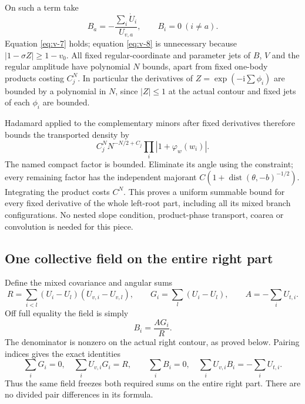 \documentclass[11pt]{article}
\numberwithin{equation}{section}
\theoremstyle{remark}\newtheorem{remark}[theorem]{Remark}
\newcommand{\ii}{\mathrm i}
\begin{document}
On such a term take
\begin{equation}\label{eq:v-10}
B_a=-\frac{\sum_i\dot U_i}{U_{v,a}},\qquad B_i=0\ (i\ne a).
\end{equation}
Equation \eqref{eq:v-7} holds; equation \eqref{eq:v-8} is unnecessary because
$|1-\sigma Z|\ge1-v_0$. All fixed regular-coordinate and parameter jets of
$B$, $V$ and the regular amplitude have polynomial $N$ bounds, apart
from fixed one-body products costing $C_j^N$. In particular the
derivatives of $Z=\exp(-\ii\sum\phi_i)$ are bounded by a polynomial
in $N$, since $|Z|\le1$ at the actual contour and fixed jets of each
$\phi_i$ are bounded.

Hadamard applied to the complementary minors after fixed derivatives
therefore bounds the transported density by
\begin{equation}\label{eq:v-11}
C_j^N N^{-N/2+C_j}\prod_i |1+\varphi_w(w_i)|.
\end{equation}
The named compact factor is bounded. Eliminate its angle using the
constraint; every remaining factor has the independent majorant
$C(1+\operatorname{dist}(\theta,-b)^{-1/2})$. Integrating the product
costs $C^N$. This proves a uniform summable bound for every fixed
derivative of the whole left-root part, including all its mixed
branch configurations. No nested slope condition, product-phase
transport, coarea or convolution is needed for this piece.

\subsection{One collective field on the entire right part}\label{sec:right-field}

Define the mixed covariance and angular sums
\[
 R=\sum_{i<l}(U_i-U_l)(U_{v,i}-U_{v,l}),\qquad
 G_i=\sum_l(U_i-U_l),\qquad A=-\sum_iU_{t,i}.
\]
Off full equality the field is simply
\begin{equation}\label{eq:v-12}
 B_i=\frac{A G_i}{R}.
\end{equation}
The denominator is nonzero on the actual right contour, as proved
below. Pairing indices gives the exact identities
\begin{equation}\label{eq:v-13}
 \sum_iG_i=0,\quad \sum_i U_{v,i}G_i=R,\qquad
 \sum_iB_i=0,\quad \sum_iU_{v,i}B_i=-\sum_iU_{t,i}.
\end{equation}
Thus the same field freezes both required sums on the entire right
part. There are no divided pair differences in its formula.
\end{document}
